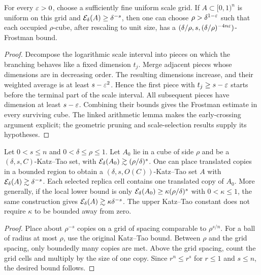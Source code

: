 \begin{lemma}
\label{lem:spacing}
For every $\varepsilon>0$, choose a sufficiently fine uniform scale grid.
If $A\subset[0,1)^n$ is uniform on this grid and
$\mathcal{E}_\delta(A)\geq\delta^{-s}$, then one can choose
$\rho>\delta^{1-\varepsilon}$ such that each occupied $\rho$-cube, after
rescaling to unit size, has a
$(\delta/\rho,s,(\delta/\rho)^{-4n\varepsilon})$-Frostman bound.
\end{lemma}
\begin{proof}
Decompose the logarithmic scale interval into pieces on which the
branching behaves like a fixed dimension $t_j$. Merge adjacent
pieces whose dimensions are in decreasing order. The resulting
dimensions increase, and their weighted average is at least
$s-\varepsilon^2$. Hence the first piece with $t_j\geq s-\varepsilon$ starts
before the terminal part of the scale interval. All subsequent pieces
have dimension at least $s-\varepsilon$. Combining their bounds gives the
Frostman estimate in every surviving cube. The linked arithmetic
lemma makes the early-crossing argument explicit; the geometric
pruning and scale-selection results supply its hypotheses.
\end{proof}

\begin{lemma}
\label{lem:block-replication}
Let $0<s\leq n$ and $0<\delta\leq\rho\leq1$. Let $A_0$ lie in a
cube of side $\rho$ and be a
$(\delta,s,C)$-Katz--Tao set, with
$\mathcal{E}_\delta(A_0)\gtrsim(\rho/\delta)^s$. One can place translated
copies in a bounded region to obtain a
$(\delta,s,O(C))$-Katz--Tao set $A$ with
$\mathcal{E}_\delta(A)\gtrsim\delta^{-s}$. Each selected replica cell
contains one translated copy of $A_0$.
More generally, if the local lower bound is only
$\mathcal{E}_\delta(A_0)\geq\kappa(\rho/\delta)^s$ with $0<\kappa\leq1$,
the same construction gives
$\mathcal{E}_\delta(A)\gtrsim\kappa\delta^{-s}$. The upper Katz--Tao
constant does not require $\kappa$ to be bounded away from zero.
\end{lemma}
\begin{proof}
Place about $\rho^{-s}$ copies on a grid of spacing comparable to
$\rho^{s/n}$. For a ball of radius at most $\rho$, use the original
Katz--Tao bound. Between $\rho$ and the grid spacing, only boundedly
many copies are met. Above the grid spacing, count the grid cells
and multiply by the size of one copy. Since $r^n\leq r^s$ for
$r\leq1$ and $s\leq n$, the desired bound follows.
\end{proof}

